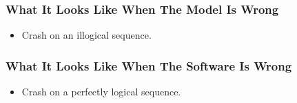 \begin{frame}
  \frametitle{What It Looks Like When The Model Is Wrong}
  \begin{itemize}
    \item Crash on an illogical sequence.
  \end{itemize}
\end{frame}

\begin{frame}
  \frametitle{What It Looks Like When The Software Is Wrong}
  \begin{itemize}
    \item Crash on a perfectly logical sequence.
  \end{itemize}
\end{frame}
